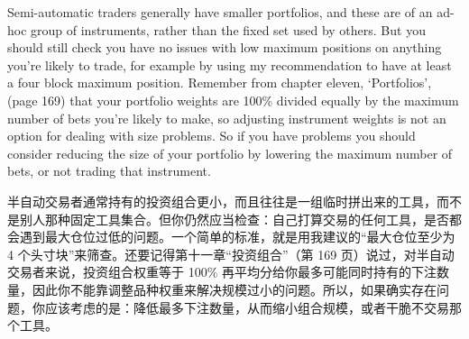 
\begin{englishblock} Semi-automatic traders generally have smaller portfolios, and these are of an ad-hoc group of instruments, rather than the fixed set used by others. But you should still check you have no issues with low maximum positions on anything you're likely to trade, for example by using my recommendation to have at least a four block maximum position. Remember from chapter eleven, ‘Portfolios', (page 169) that your portfolio weights are 100\% divided equally by the maximum number of bets you're likely to make, so adjusting instrument weights is not an option for dealing with size problems. So if you have problems you should consider reducing the size of your portfolio by lowering the maximum number of bets, or not trading that instrument. \end{englishblock}

\begin{chineseblock}半自动交易者通常持有的投资组合更小，而且往往是一组临时拼出来的工具，而不是别人那种固定工具集合。但你仍然应当检查：自己打算交易的任何工具，是否都会遇到最大仓位过低的问题。一个简单的标准，就是用我建议的“最大仓位至少为 4 个头寸块”来筛查。还要记得第十一章“投资组合”（第 169 页）说过，对半自动交易者来说，投资组合权重等于 100\% 再平均分给你最多可能同时持有的下注数量，因此你不能靠调整品种权重来解决规模过小的问题。所以，如果确实存在问题，你应该考虑的是：降低最多下注数量，从而缩小组合规模，或者干脆不交易那个工具。\end{chineseblock}



